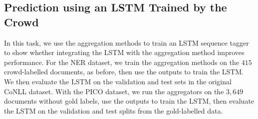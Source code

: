 \subsection{Prediction using an LSTM Trained by the Crowd}\label{sec:task2}

In this task, we use the aggregation methods to train an LSTM sequence tagger \cite{lample2016neural}
to show whether integrating the LSTM with the aggregation method improves performance.
For the NER dataset, we train the aggregation methods on the $415$ crowd-labelled documents, as before,
then use the outputs to train the LSTM. We then evaluate the LSTM on the validation and test sets
in the original CoNLL dataset.
With the PICO dataset, we run the aggregators on the $3,649$ documents without gold labels, 
use the outputs to train the LSTM, then evaluate the LSTM on the validation and test splits from the gold-labelled data.



